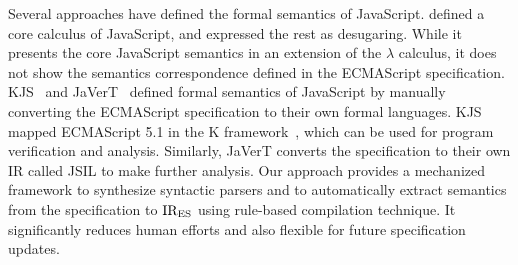 Several approaches have defined the formal semantics of JavaScript.
\citet{lambdajs} defined a core calculus of JavaScript, and expressed the
rest as desugaring.  While it presents the core JavaScript semantics in
an extension of the $\lambda$ calculus, it does not show the semantics
correspondence defined in the ECMAScript specification.  KJS~\citet{kjs} and
JaVerT~\citet{javert} defined formal semantics of JavaScript by manually converting
the ECMAScript specification to their own formal languages.  KJS mapped
ECMAScript 5.1 in the K framework~\cite{kframework}, which can be used
for program verification and analysis.  Similarly, JaVerT converts the
specification to their own IR called JSIL to make further analysis.
Our approach provides a mechanized framework to synthesize syntactic parsers and
to automatically extract semantics from the specification to \( \text{IR}_\text{ES} \)
using rule-based compilation technique. It significantly reduces human
efforts and also flexible for future specification updates.

